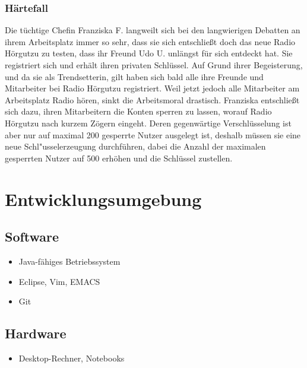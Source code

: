 \documentclass[a4paper,10pt]{scrartcl}
\begin{document}
\subsubsection{Härtefall}
Die tüchtige Chefin Franziska F. langweilt sich bei den langwierigen
Debatten an ihrem Arbeitsplatz immer so sehr, dass sie sich entschließt doch
das neue Radio Hörgutzu zu testen, dass ihr Freund Udo U. unlängst für sich entdeckt hat.
Sie registriert sich und erhält ihren privaten Schlüssel.
Auf Grund ihrer Begeisterung, und da sie als Trendsetterin, gilt haben sich bald alle ihre Freunde
und Mitarbeiter bei Radio Hörgutzu registriert. Weil jetzt jedoch alle Mitarbeiter am Arbeitsplatz
Radio hören, sinkt die Arbeitsmoral drastisch. Franziska entschließt sich dazu, ihren Mitarbeitern
die Konten sperren zu lassen, worauf Radio Hörgutzu nach kurzem Zögern eingeht. Deren
gegenwärtige Verschlüsselung ist aber nur auf maximal 200 gesperrte
Nutzer ausgelegt ist, deshalb müssen sie eine neue Schl"usselerzeugung durchführen,
dabei die Anzahl der maximalen gesperrten Nutzer auf 500 erhöhen und die Schlüssel zustellen.

\clearpage
\section{Entwicklungsumgebung}

\subsection{Software}
\begin{itemize}
\item Java-fähiges Betriebssystem
\item Eclipse, Vim, EMACS
\item Git
\end{itemize}
\subsection{Hardware}
\begin{itemize}
\item Desktop-Rechner, Notebooks
\end{itemize}



{}

\end{document}
